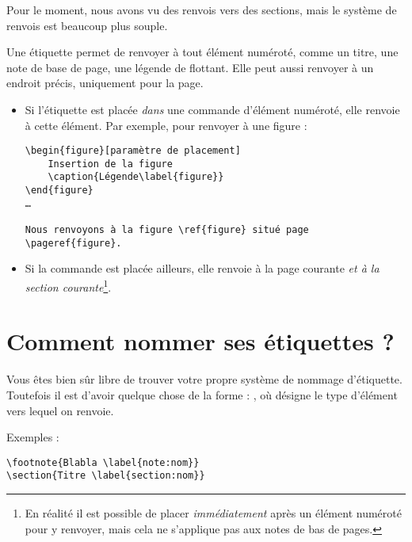 Pour le moment, nous avons vu des renvois vers des sections, mais le système de renvois est beaucoup plus souple.

Une étiquette permet de renvoyer à tout élément numéroté, comme un titre, une note de base de page, une légende de flottant. Elle peut aussi renvoyer à un endroit précis, uniquement pour la page.

\begin{itemize}
\item Si l'étiquette  est placée \emph{dans}  une commande  d'élément numéroté, elle renvoie à cette élément. Par exemple, pour renvoyer à une figure  :
\begin{verbatim}
\begin{figure}[paramètre de placement]
	Insertion de la figure
	\caption{Légende\label{figure}}
\end{figure} 
…

Nous renvoyons à la figure \ref{figure} situé page \pageref{figure}.
\end{verbatim}
\item Si la commande est placée ailleurs, elle renvoie à la page courante \emph{et à la section courante}\footnote{En réalité il est possible de placer \emph{immédiatement} après un élément numéroté pour y renvoyer, mais cela ne s'applique pas aux notes de bas de pages.}.
\end{itemize}

\section{Comment nommer ses étiquettes ?}

Vous êtes bien sûr libre de trouver votre propre système de nommage d'étiquette. Toutefois il est d'avoir quelque chose de la forme : , où  désigne le type d'élément vers lequel on renvoie.

Exemples :

\begin{verbatim}
\footnote{Blabla \label{note:nom}}
\section{Titre \label{section:nom}}
\end{verbatim}


